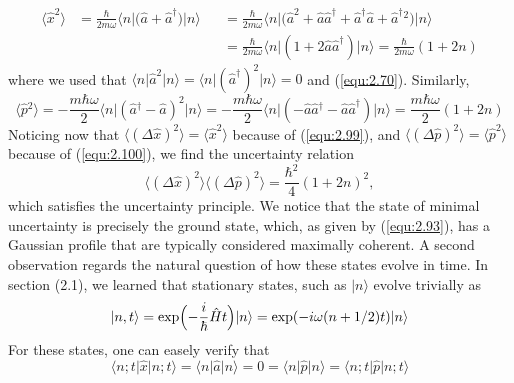 \begin{subequations}
  \begin{alignat}{4}
    \langle \hat{x}^2\rangle  &= \frac{\hbar}{2m\omega}
    \langle n\vert \bigl(\hat{a}+\hat{a}^{\dagger}\bigr)\vert n\rangle  &&=
    \frac{\hbar}{2m\omega}\langle n\vert \bigl(\hat{a}^2 +
    \hat{a}\hat{a}^{\dagger} + \hat{a}^{\dagger}\hat{a} +
    \hat{a}^{\dagger}{}^2\bigr)\vert n\rangle  \nonumber \\
    &{} &&= \frac{\hbar}{2m\omega}\langle n\vert (1 +
    2\hat{a}\hat{a}^{\dagger})\vert n\rangle  =
    \frac{\hbar}{2m\omega}(1+2n) \label{equ:2.101}
  \end{alignat}
\end{subequations}
where we used that $\langle n\vert \hat{a}^2\vert n\rangle  =
\langle n\vert (\hat{a}^{\dagger})^2 \vert  n\rangle  = 0$ and (\ref{equ:2.70}).
Similarly,
\begin{equation}
  \langle \hat{p}{}^2\rangle  = - \frac{m\hbar\omega}{2}
  \langle n\vert (\hat{a}{}^{\dagger}-\hat{a})^2 \vert n\rangle  =
  -\frac{m\hbar\omega}{2}
  \langle n\vert (-\hat{a}\hat{a}{}^{\dagger}-\hat{a}\hat{a}^{\dagger})\vert n\rangle 
  =
  \frac{m\hbar\omega}{2}(1+2n)
  \label{equ:2.102}
\end{equation}
Noticing now that $\langle (\Delta \hat{x})^2 \rangle  = \langle \hat{x}^2\rangle $
because of (\ref{equ:2.99}), and $\langle (\Delta \hat{p})^2\rangle  =
\langle \hat{p}^2\rangle $ because of (\ref{equ:2.100}), we find the
uncertainty relation
\begin{equation}
  \langle (\Delta \hat{x})^2 \rangle  \langle  (\Delta \hat{p})^2\rangle  =
  \frac{\hbar^2}{4}(1+2n)^2,
  \label{equ:2.102}
\end{equation}
which satisfies the uncertainty principle. We notice that
the state of minimal uncertainty is precisely the ground
state, which, as given by (\ref{equ:2.93}), has a Gaussian
profile that are typically considered maximally coherent.
A second observation regards the natural question of how
these states evolve in time. In section (2.1),
we learned that stationary states, such as $\vert n\rangle $ evolve
trivially as
\begin{equation}
  \vert n,t\rangle  = \exp\Bigl(-\frac{i}{\hbar}\hat{H}t\Bigr) \vert n\rangle  = \exp(-i\omega
  (n+1/2)t)\vert n\rangle 
  \label{equ:2.103}
\end{equation}
For these states, one can easely verify that
\begin{equation}
  \langle n;t\vert \hat{x}\vert n;t\rangle  = \langle n\vert \hat{a}\vert n\rangle  = 0 =
  \langle n\vert \hat{p}\vert n\rangle  = \langle n;t\vert \hat{p}\vert n;t\rangle 
  \label{equ:2.104}
\end{equation}
